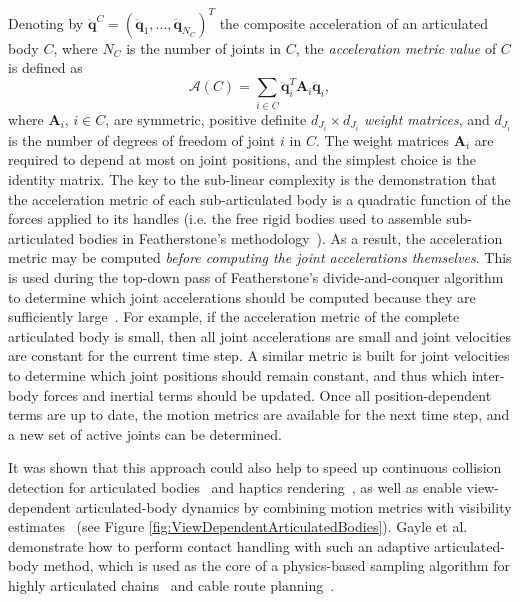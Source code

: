 Denoting by $\mathbf{\ddot{q}}^C=(\mathbf{\ddot{q}}_1,\ldots,\mathbf{\ddot{q}}_{N_C})^T$
the composite acceleration of an articulated body $C$, where $N_C$ is the number of joints in $C$, the \emph{acceleration
metric value} of $C$ is defined as
\[\mathcal{A}(C)=\sum_{i\in C}\mathbf{\ddot{q}}_i^T\mathbf{A}_i\mathbf{\ddot{q}}_i,\] where $\mathbf{A}_i$, $i\in C$, are symmetric, positive definite $d_{J_i}\times d_{J_i}$ \emph{weight matrices}, and $d_{J_i}$ is
the number of degrees of freedom of joint $i$ in $C$. The weight matrices $\mathbf{A}_i$ are required to depend at most on joint positions, and the simplest choice is the identity
matrix. The key to the sub-linear complexity is the demonstration that the acceleration metric of each sub-articulated body is a quadratic function of the forces applied to its handles (i.e. the free rigid bodies used to assemble sub-articulated bodies in Featherstone's methodology~\cite{Redon2005}). As a result, the acceleration metric may be computed \emph{before computing the joint accelerations themselves}. This is used during the top-down pass of Featherstone's divide-and-conquer algorithm to determine which joint accelerations should be computed because they are sufficiently large~\cite{Redon2005}. For example, if the acceleration metric of the complete articulated body is small, then all joint accelerations are small and joint velocities are constant for the current time step. A similar metric is built for joint velocities to determine which joint positions should remain constant, and thus which inter-body forces and inertial terms should be updated. Once all position-dependent terms are up to date, the motion metrics are available for the next time step, and a new set of active joints can be determined.

It was shown that this approach could also help to speed up continuous collision detection for articulated bodies~\cite{Kim2008Collision} and haptics rendering~\cite{Morin2007}, as well as enable view-dependent articulated-body dynamics by combining motion metrics with visibility estimates~\cite{Kim2008View} (see Figure \ref{fig:ViewDependentArticulatedBodies}).
Gayle et al. \cite{Gayle2006} demonstrate how to perform contact handling with such an adaptive articulated-body method, which is used as the core of a physics-based sampling algorithm for highly articulated chains~\cite{Gayle2007} and cable route planning~\cite{Kabul2007}.

